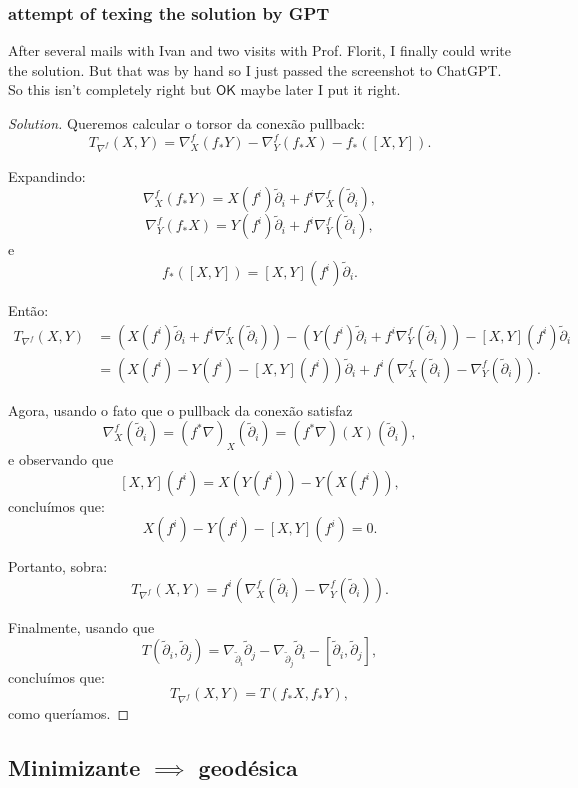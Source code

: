 \subsubsection*{attempt of texing the solution by GPT}
After several mails with Ivan and two visits with Prof. Florit, I finally could write the solution. But that was by hand so I just passed the screenshot to ChatGPT. So this isn't completely right but \(\mathsf{OK}\) maybe later I put it right.
\begin{proof}[Solution]
Queremos calcular o torsor da conexão pullback:
\[
T_{\nabla^f}(X, Y) = \nabla^f_X (f_*Y) - \nabla^f_Y (f_*X) - f_*([X, Y]).
\]

Expandindo:
\[
\nabla^f_X (f_*Y) = X(f^i) \tilde{\partial}_i + f^i \nabla^f_X(\tilde{\partial}_i),
\]
\[
\nabla^f_Y (f_*X) = Y(f^i) \tilde{\partial}_i + f^i \nabla^f_Y(\tilde{\partial}_i),
\]
e
\[
f_*([X,Y]) = [X,Y](f^i) \tilde{\partial}_i.
\]

Então:
\begin{align*}
T_{\nabla^f}(X,Y)
&= \left( X(f^i) \tilde{\partial}_i + f^i \nabla^f_X(\tilde{\partial}_i) \right) - \left( Y(f^i) \tilde{\partial}_i + f^i \nabla^f_Y(\tilde{\partial}_i) \right) - [X,Y](f^i) \tilde{\partial}_i \\
&= \left( X(f^i) - Y(f^i) - [X,Y](f^i) \right) \tilde{\partial}_i + f^i \left( \nabla^f_X(\tilde{\partial}_i) - \nabla^f_Y(\tilde{\partial}_i) \right).
\end{align*}

Agora, usando o fato que o pullback da conexão satisfaz
\[
\nabla^f_X (\tilde{\partial}_i) = (f^*\nabla)_X (\tilde{\partial}_i) = (f^*\nabla)(X)(\tilde{\partial}_i),
\]
e observando que
\[
[X,Y](f^i) = X(Y(f^i)) - Y(X(f^i)),
\]
concluímos que:
\[
X(f^i) - Y(f^i) - [X,Y](f^i) = 0.
\]

Portanto, sobra:
\[
T_{\nabla^f}(X,Y) = f^i \left( \nabla^f_X(\tilde{\partial}_i) - \nabla^f_Y(\tilde{\partial}_i) \right).
\]

Finalmente, usando que
\[
T(\tilde{\partial}_i, \tilde{\partial}_j) = \nabla_{\tilde{\partial}_i} \tilde{\partial}_j - \nabla_{\tilde{\partial}_j} \tilde{\partial}_i - [\tilde{\partial}_i, \tilde{\partial}_j],
\]
concluímos que:
\[
T_{\nabla^f}(X,Y) = T(f_*X, f_*Y),
\]
como queríamos.

\end{proof}


\subsection{Minimizante \(\implies\) geodésica}

